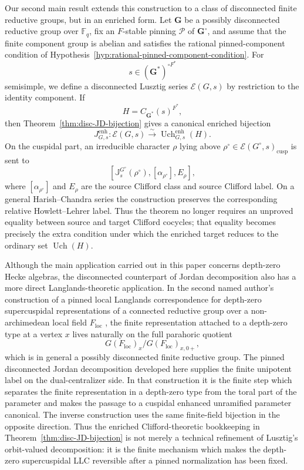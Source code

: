 \documentclass{amsart}
\theoremstyle{plain}
\numberwithin{equation}{section}
\theoremstyle{definition}
\newcommand{\cP}{\mathcal{P}}
\newcommand{\cE}{\mathcal{E}}
\newcommand{\Uch}{\operatorname{Uch}}
\newcommand{\J}{\mathbb{J}}
\newcommand{\cusp}{\operatorname{cusp}}
\newcommand{\bG}{\mathbf{G}}
\newcommand{\F}{\mathbb{F}}
\begin{document}
Our second main result extends this construction to a class of disconnected
finite reductive groups, but in an enriched form.  Let \(\bG\) be a possibly
disconnected reductive group over \(\F_q\), fix an \(F\)-stable pinning \(\cP\) of
\(\bG^\circ\), and assume that the finite component group is abelian and
satisfies the rational pinned-component condition of
Hypothesis~\ref{hyp:rational-pinned-component-condition}.  For
\[
s\in(\bG^*)^{\circ F^*}
\]
semisimple, we define a disconnected Lusztig series \(\cE(G,s)\) by restriction
to the identity component.  If
\[
H=C_{\bG^*}(s)^{F^*},
\]
then Theorem~\ref{thm:disc-JD-bijection} gives a canonical enriched bijection
\[
J^{\mathrm{enh}}_{G,s}:\cE(G,s)
\xrightarrow{\sim}
\Uch^{\mathrm{enh}}_{G,s}(H).
\]
On the cuspidal part, an irreducible character \(\rho\) lying above
\(\rho^\circ\in\cE(G^\circ,s)_{\cusp}\) is sent to
\[
\left[
\J_s^{G^\circ}(\rho^\circ),
[\alpha_{\rho^\circ}],
E_\rho
\right],
\]
where \([\alpha_{\rho^\circ}]\) and \(E_\rho\) are the source Clifford class and
source Clifford label.  On a general Harish--Chandra series the construction
preserves the corresponding relative Howlett--Lehrer label.  Thus the theorem
no longer requires an unproved equality between source and target Clifford
cocycles; that equality becomes precisely the extra condition under which the
enriched target reduces to the ordinary set \(\Uch(H)\).

Although the main application carried out in this paper concerns depth-zero
Hecke algebras, the disconnected counterpart of Jordan decomposition also has a
more direct Langlands-theoretic application.  In the second named author's
construction of a pinned local Langlands correspondence for depth-zero
supercuspidal representations of a connected reductive group over a
non-archimedean local field \(F_{\mathrm{loc}}\)
\cite{Mishra2026PinnedLLCDepthZero}, the finite representation attached to a
depth-zero type at a vertex \(x\) lives naturally on the full parahoric quotient
\[
G(F_{\mathrm{loc}})_x/G(F_{\mathrm{loc}})_{x,0+},
\]
which is in general a possibly disconnected finite reductive group.  The
pinned disconnected Jordan decomposition developed here supplies the finite
unipotent label on the dual-centralizer side.  In that construction it is the
finite step which separates the finite representation in a depth-zero type from
the toral part of the parameter and makes the passage to a cuspidal enhanced
unramified parameter canonical.  The inverse construction uses the same
finite-field bijection in the opposite direction.  Thus the enriched
Clifford-theoretic bookkeeping in Theorem~\ref{thm:disc-JD-bijection} is not
merely a technical refinement of Lusztig's orbit-valued decomposition: it is the
finite mechanism which makes the depth-zero supercuspidal LLC reversible after a
pinned normalization has been fixed.
\end{document}
